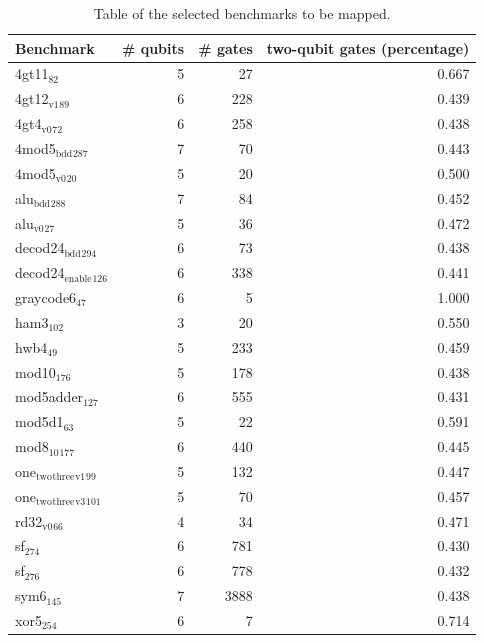 \begin{table}[htbp]
\caption{Table of the selected benchmarks to be mapped.}
\centering
\small
\begin{tabular}{lrrr}
\hline
Benchmark & \# qubits & \# gates & two-qubit gates (percentage)\\
\hline
4gt11\(_{\text{82}}\) & 5 & 27 & 0.667\\
4gt12\(_{\text{v1}}\)\(_{\text{89}}\) & 6 & 228 & 0.439\\
4gt4\(_{\text{v0}}\)\(_{\text{72}}\) & 6 & 258 & 0.438\\
4mod5\(_{\text{bdd}}\)\(_{\text{287}}\) & 7 & 70 & 0.443\\
4mod5\(_{\text{v0}}\)\(_{\text{20}}\) & 5 & 20 & 0.500\\
alu\(_{\text{bdd}}\)\(_{\text{288}}\) & 7 & 84 & 0.452\\
alu\(_{\text{v0}}\)\(_{\text{27}}\) & 5 & 36 & 0.472\\
decod24\(_{\text{bdd}}\)\(_{\text{294}}\) & 6 & 73 & 0.438\\
decod24\(_{\text{enable}}\)\(_{\text{126}}\) & 6 & 338 & 0.441\\
graycode6\(_{\text{47}}\) & 6 & 5 & 1.000\\
ham3\(_{\text{102}}\) & 3 & 20 & 0.550\\
hwb4\(_{\text{49}}\) & 5 & 233 & 0.459\\
mod10\(_{\text{176}}\) & 5 & 178 & 0.438\\
mod5adder\(_{\text{127}}\) & 6 & 555 & 0.431\\
mod5d1\(_{\text{63}}\) & 5 & 22 & 0.591\\
mod8\(_{\text{10}}\)\(_{\text{177}}\) & 6 & 440 & 0.445\\
one\(_{\text{two}}\)\(_{\text{three}}\)\(_{\text{v1}}\)\(_{\text{99}}\) & 5 & 132 & 0.447\\
one\(_{\text{two}}\)\(_{\text{three}}\)\(_{\text{v3}}\)\(_{\text{101}}\) & 5 & 70 & 0.457\\
rd32\(_{\text{v0}}\)\(_{\text{66}}\) & 4 & 34 & 0.471\\
sf\(_{\text{274}}\) & 6 & 781 & 0.430\\
sf\(_{\text{276}}\) & 6 & 778 & 0.432\\
sym6\(_{\text{145}}\) & 7 & 3888 & 0.438\\
xor5\(_{\text{254}}\) & 6 & 7 & 0.714\\
\hline
\end{tabular}
\end{table}

